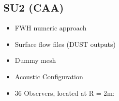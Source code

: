 \subsection{SU2 (CAA)}
\begin{frame}{\subsecname}
    \begin{itemize}
        \item FWH numeric approach
        \item Surface flow files (DUST outputs)
        \item Dummy mesh
        \item Acoustic Configuration
        \item 36 Observers, located at R = 2m:
    \end{itemize}

\begin{figure}
  \quad
\end{figure}
\end{frame}
